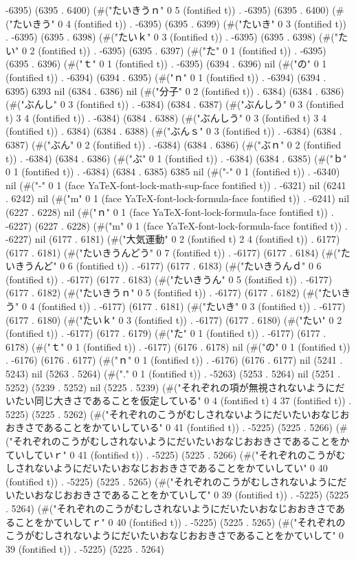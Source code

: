 -6395) (6395 . 6400) (#("たいきうｎ" 0 5 (fontified t)) . -6395) (6395 . 6400) (#("たいきう" 0 4 (fontified t)) . -6395) (6395 . 6399) (#("たいき" 0 3 (fontified t)) . -6395) (6395 . 6398) (#("たいｋ" 0 3 (fontified t)) . -6395) (6395 . 6398) (#("たい" 0 2 (fontified t)) . -6395) (6395 . 6397) (#("た" 0 1 (fontified t)) . -6395) (6395 . 6396) (#("ｔ" 0 1 (fontified t)) . -6395) (6394 . 6396) nil (#("の" 0 1 (fontified t)) . -6394) (6394 . 6395) (#("ｎ" 0 1 (fontified t)) . -6394) (6394 . 6395) 6393 nil (6384 . 6386) nil (#("分子" 0 2 (fontified t)) . 6384) (6384 . 6386) (#("ぶんし" 0 3 (fontified t)) . -6384) (6384 . 6387) (#("ぶんしう" 0 3 (fontified t) 3 4 (fontified t)) . -6384) (6384 . 6388) (#("ぶんしう" 0 3 (fontified t) 3 4 (fontified t)) . 6384) (6384 . 6388) (#("ぶんｓ" 0 3 (fontified t)) . -6384) (6384 . 6387) (#("ぶん" 0 2 (fontified t)) . -6384) (6384 . 6386) (#("ぶｎ" 0 2 (fontified t)) . -6384) (6384 . 6386) (#("ぶ" 0 1 (fontified t)) . -6384) (6384 . 6385) (#("ｂ" 0 1 (fontified t)) . -6384) (6384 . 6385) 6385 nil (#("-" 0 1 (fontified t)) . -6340) nil (#("-" 0 1 (face YaTeX-font-lock-math-sup-face fontified t)) . -6321) nil (6241 . 6242) nil (#("m" 0 1 (face YaTeX-font-lock-formula-face fontified t)) . -6241) nil (6227 . 6228) nil (#("ｎ" 0 1 (face YaTeX-font-lock-formula-face fontified t)) . -6227) (6227 . 6228) (#("m" 0 1 (face YaTeX-font-lock-formula-face fontified t)) . -6227) nil (6177 . 6181) (#("大気運動" 0 2 (fontified t) 2 4 (fontified t)) . 6177) (6177 . 6181) (#("たいきうんどう" 0 7 (fontified t)) . -6177) (6177 . 6184) (#("たいきうんど" 0 6 (fontified t)) . -6177) (6177 . 6183) (#("たいきうんｄ" 0 6 (fontified t)) . -6177) (6177 . 6183) (#("たいきうん" 0 5 (fontified t)) . -6177) (6177 . 6182) (#("たいきうｎ" 0 5 (fontified t)) . -6177) (6177 . 6182) (#("たいきう" 0 4 (fontified t)) . -6177) (6177 . 6181) (#("たいき" 0 3 (fontified t)) . -6177) (6177 . 6180) (#("たいｋ" 0 3 (fontified t)) . -6177) (6177 . 6180) (#("たい" 0 2 (fontified t)) . -6177) (6177 . 6179) (#("た" 0 1 (fontified t)) . -6177) (6177 . 6178) (#("ｔ" 0 1 (fontified t)) . -6177) (6176 . 6178) nil (#("の" 0 1 (fontified t)) . -6176) (6176 . 6177) (#("ｎ" 0 1 (fontified t)) . -6176) (6176 . 6177) nil (5241 . 5243) nil (5263 . 5264) (#("." 0 1 (fontified t)) . -5263) (5253 . 5264) nil (5251 . 5252) (5239 . 5252) nil (5225 . 5239) (#("それぞれの項が無視されないようにだいたい同じ大きさであることを仮定している" 0 4 (fontified t) 4 37 (fontified t)) . 5225) (5225 . 5262) (#("それぞれのこうがむしされないようにだいたいおなじおおきさであることをかていしている" 0 41 (fontified t)) . -5225) (5225 . 5266) (#("それぞれのこうがむしされないようにだいたいおなじおおきさであることをかていしていｒ" 0 41 (fontified t)) . -5225) (5225 . 5266) (#("それぞれのこうがむしされないようにだいたいおなじおおきさであることをかていしてい" 0 40 (fontified t)) . -5225) (5225 . 5265) (#("それぞれのこうがむしされないようにだいたいおなじおおきさであることをかていして" 0 39 (fontified t)) . -5225) (5225 . 5264) (#("それぞれのこうがむしされないようにだいたいおなじおおきさであることをかていしてｒ" 0 40 (fontified t)) . -5225) (5225 . 5265) (#("それぞれのこうがむしされないようにだいたいおなじおおきさであることをかていして" 0 39 (fontified t)) . -5225) (5225 . 5264) 